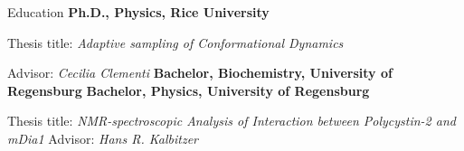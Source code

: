 \begin{rubric}{Education}
%
\entry*[2014 -- 2020]%
	\textbf{Ph.D., Physics, Rice University}
	\par Thesis title: \emph{Adaptive sampling of Conformational Dynamics}
  \par Advisor: \emph{Cecilia Clementi}
%
\entry*[2012 -- 2014]%
	\textbf{Bachelor, Biochemistry, University of Regensburg} 
%
\entry*[2012]%
  \textbf{Bachelor, Physics, University of Regensburg}
  \par Thesis title: \emph{NMR-spectroscopic Analysis of Interaction between Polycystin-2 and mDia1}  Advisor: \emph{Hans R. Kalbitzer}
\end{rubric}
